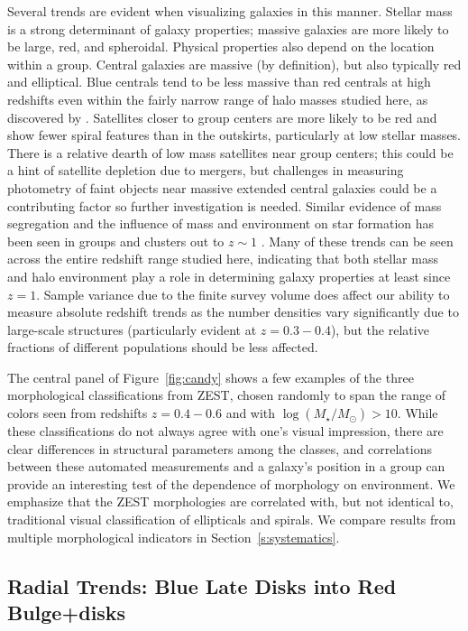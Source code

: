 \documentclass[12pt]{emulateapj}
\begin{document}
Several trends are evident when visualizing galaxies in this
manner. Stellar mass is a strong determinant of galaxy properties;
massive galaxies are more likely to be large, red, and
spheroidal. Physical properties also depend on the location within a
group. Central galaxies are massive (by definition), but also
typically red and elliptical. Blue centrals tend to be less massive
than red centrals at high redshifts even within the fairly narrow
range of halo masses studied here, as discovered by
\citet{Tinker2012}. Satellites closer to group centers are more likely
to be red and show fewer spiral features than in the outskirts,
particularly at low stellar masses. There is a relative dearth of low
mass satellites near group centers; this could be a hint of satellite
depletion due to mergers, but challenges in measuring photometry of
faint objects near massive extended central galaxies could be a
contributing factor so further investigation is needed. Similar
evidence of mass segregation and the influence of mass and environment
on star formation has been seen in groups and clusters out to $z\sim
1$ \citep{Muzzin2012, Presotto2012}. Many of these trends can be seen
across the entire redshift range studied here, indicating that both
stellar mass and halo environment play a role in determining galaxy
properties at least since $z=1$. Sample variance due to the finite
survey volume does affect our ability to measure absolute redshift
trends as the number densities vary significantly due to large-scale
structures (particularly evident at $z=0.3-0.4$), but the relative
fractions of different populations should be less affected.

The central panel of Figure~\ref{fig:candy} shows a few examples of
the three morphological classifications from ZEST, chosen randomly to
span the range of colors seen from redshifts $z=0.4-0.6$ and with
$\log(M_{\star}/M_{\odot})>10$. While these classifications do not
always agree with one's visual impression, there are clear differences
in structural parameters among the classes, and correlations between these automated
measurements and a galaxy's position in a group can provide an
interesting test of the dependence of morphology on environment. We
emphasize that the ZEST morphologies are correlated with, but not
identical to, traditional visual classification of ellipticals and
spirals. We compare results from multiple morphological indicators in
Section~\ref{s:systematics}.

\subsection{Radial Trends: Blue Late Disks into Red Bulge+disks}
\label{s:rtrends}
\end{document}
